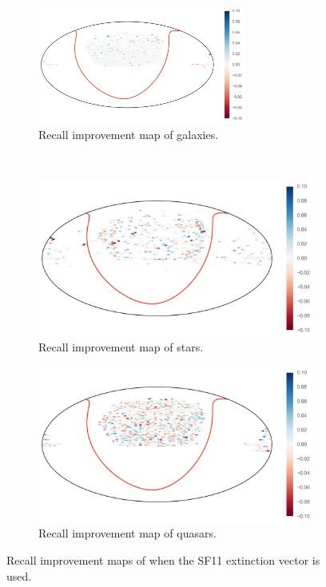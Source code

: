 \begin{figure}[p]
	\centering
	\begin{subfigure}{\textwidth}
		\centering
		\includegraphics[width=0.75\textwidth]{figures/appendix/map_recall_sf11_Galaxy}
		\caption{Recall improvement map of galaxies.}
		\label{fig:map_recall_sf11_galaxies}
	\end{subfigure}\\
	\begin{subfigure}{\textwidth}
		\centering
		\includegraphics[width=0.75\linewidth]{figures/appendix/map_recall_sf11_Star}
		\caption{Recall improvement map of stars.}
		\label{fig:map_recall_sf11_stars}
	\end{subfigure}
	\begin{subfigure}{\textwidth}
		\centering
		\includegraphics[width=0.75\linewidth]{figures/appendix/map_recall_sf11_Quasar}
		\caption{Recall improvement map of quasars.}
		\label{fig:map_recall_sf11_quasars}
	\end{subfigure}
	\caption[Recall improvement maps of when with SF11]{
        Recall improvement maps of when the SF11 extinction vector is used.}
	\label{fig:map_recall_sf11}
\end{figure}


